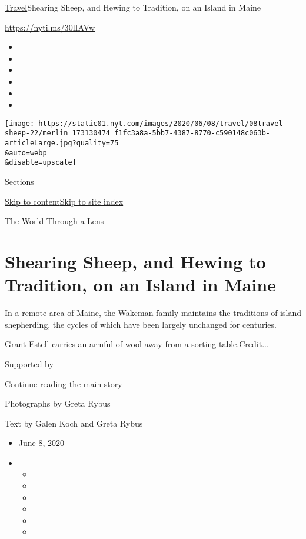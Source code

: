 \href{/section/travel}{Travel}\textbar{}Shearing Sheep, and Hewing to
Tradition, on an Island in Maine

\url{https://nyti.ms/30lIAVw}

\begin{itemize}
\item
\item
\item
\item
\item
\item
\end{itemize}

\texttt{[image: https://static01.nyt.com/images/2020/06/08/travel/08travel-sheep-22/merlin\_173130474\_f1fc3a8a-5bb7-4387-8770-c590148c063b-articleLarge.jpg?quality=75\\\&auto=webp\\\&disable=upscale]}

Sections

\protect\hyperlink{site-content}{Skip to
content}\protect\hyperlink{site-index}{Skip to site index}

The World Through a Lens

\hypertarget{shearing-sheep-and-hewing-to-tradition-on-an-island-in-maine}{%
\section{Shearing Sheep, and Hewing to Tradition, on an Island in
Maine}\label{shearing-sheep-and-hewing-to-tradition-on-an-island-in-maine}}

In a remote area of Maine, the Wakeman family maintains the traditions
of island shepherding, the cycles of which have been largely unchanged
for centuries.

Grant Estell carries an armful of wool away from a sorting
table.Credit...

Supported by

\protect\hyperlink{after-sponsor}{Continue reading the main story}

Photographs by Greta Rybus

Text by Galen Koch and Greta Rybus

\begin{itemize}
\item
  June 8, 2020
\item
  \begin{itemize}
  \item
  \item
  \item
  \item
  \item
  \item
  \end{itemize}
\end{itemize}

